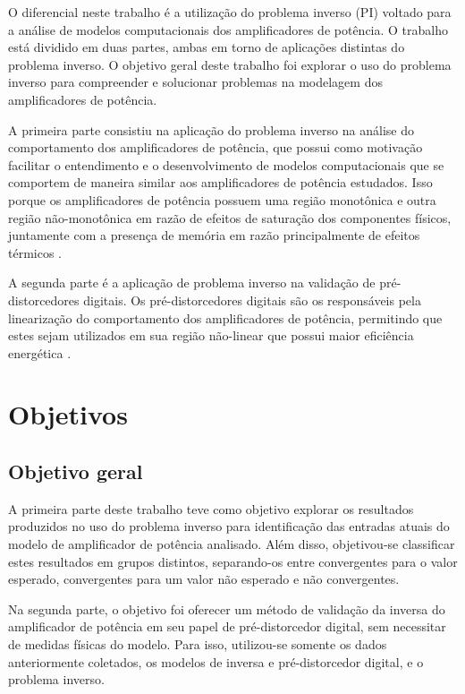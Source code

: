 O diferencial neste trabalho é a utilização do problema inverso (PI) voltado para a análise de modelos computacionais dos amplificadores de potência. O trabalho está dividido em duas partes, ambas em torno de aplicações distintas do problema inverso. O objetivo geral deste trabalho foi explorar o uso do problema inverso para compreender e solucionar problemas na modelagem dos amplificadores de potência.

A primeira parte consistiu na aplicação do problema inverso na análise do comportamento dos amplificadores de potência, que possui como motivação facilitar o entendimento e o desenvolvimento de modelos computacionais que se comportem de maneira similar aos amplificadores de potência estudados. Isso porque os amplificadores de potência possuem uma região monotônica e outra região não-monotônica em razão de efeitos de saturação dos componentes físicos, juntamente com a presença de memória em razão principalmente de efeitos térmicos \cite{pedro_comparative_2005}.

A segunda parte é a aplicação de problema inverso na validação de pré-distorcedores digitais. Os pré-distorcedores digitais são os responsáveis pela linearização do comportamento dos amplificadores de potência, permitindo que estes sejam utilizados em sua região não-linear que possui maior eficiência energética \cite{kenington_high-linearity_2000}.

\section{Objetivos} \label{sec:introd-obje}

\subsection{Objetivo geral} \label{ssec:introd-obje-geral}
A primeira parte deste trabalho teve como objetivo explorar os resultados produzidos no uso do problema inverso para identificação das entradas atuais do modelo de amplificador de potência analisado. Além disso, objetivou-se classificar estes resultados em grupos distintos, separando-os entre convergentes para o valor esperado, convergentes para um valor não esperado e não convergentes.

Na segunda parte, o objetivo foi oferecer um método de validação da inversa do amplificador de potência em seu papel de pré-distorcedor digital, sem necessitar de medidas físicas do modelo. Para isso, utilizou-se somente os dados anteriormente coletados, os modelos de inversa e pré-distorcedor digital, e o problema inverso.

